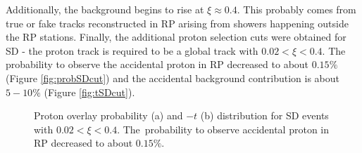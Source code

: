  Additionally, the background begins to rise at $\xi\approx 0.4$. This probably comes from  true or fake tracks reconstructed in RP arising from showers happening outside the RP stations. Finally, the additional proton selection cuts were obtained for SD - the proton track is required to be a global track with $0.02 < \xi < 0.4$. The probability to observe the accidental proton in RP decreased to about $0.15\%$ (Figure \ref{fig:probSDcut}) and the accidental background contribution is about $5-10\%$ (Figure \ref{fig:tSDcut}).
 \begin{figure}[H]
 	\centering
 	\parbox{0.48\textwidth}{
 		\centering
 		\begin{subfigure}[b]{\linewidth}{
 				}
 		\end{subfigure}
 	}
 	\quad
 	\parbox{0.48\textwidth}{
 		\centering
 		\begin{subfigure}[b]{\linewidth}{
 				}
 		\end{subfigure}
 	}
 	\caption[Proton overlay probability and $-t$ distribution for SD events with $0.02 < \xi < 0.4$]{Proton overlay probability (a) and $-t$ (b) distribution for SD events with $0.02 < \xi < 0.4$. The~probability to observe accidental proton in RP decreased to about $0.15\%$.}
 \end{figure}
